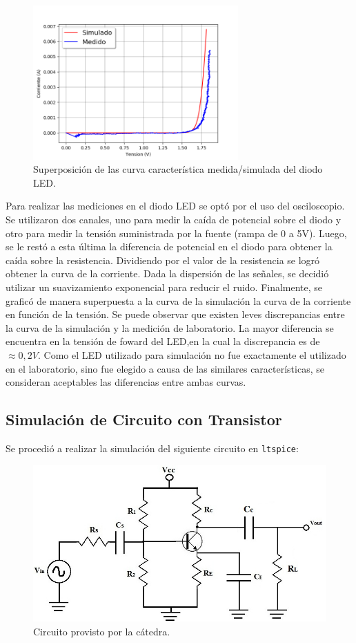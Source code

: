 \documentclass[a4paper]{article}
\begin{document}
\begin{figure}[H]
	\centering
	\includegraphics[width=0.7\textwidth]{CurvaDiodosLed.png}
	\caption{Superposición de las curva característica medida/simulada del diodo LED.}
	\label{fig:diodoled}
\end{figure}

Para realizar las mediciones en el diodo LED se optó por el uso del osciloscopio. Se utilizaron dos canales, uno para medir la caída de potencial sobre el diodo y otro para medir la tensión suministrada por la fuente (rampa de 0 a 5V). Luego, se le restó a esta última la diferencia de potencial en el diodo para obtener la caída sobre la resistencia. Dividiendo por el valor de la resistencia se logró obtener la curva de la corriente. Dada la dispersión de las señales, se decidió utilizar un suavizamiento exponencial para reducir el ruido. Finalmente, se graficó de manera superpuesta a la curva de la simulación la curva de la corriente en función de la tensión.
Se puede observar que existen leves discrepancias entre la curva de la simulación y la medición de laboratorio. La mayor diferencia se encuentra en la tensión de foward del LED,en  la cual la discrepancia es de $\approx 0,2V$.
Como el LED utilizado para simulación no fue exactamente el utilizado en el laboratorio, sino fue elegido a causa de las similares características, se consideran aceptables las diferencias entre ambas curvas.

\subsection*{Simulación de Circuito con Transistor}

Se procedió a realizar la simulación del siguiente circuito en \texttt{ltspice}:
\begin{figure}[H]
	\centering
	\includegraphics[width=0.6 \textwidth]{commonEmitter.jpg}	
	\caption{Circuito provisto por la cátedra.}
	\label{fig:cmnemitnpn}

\end{figure}
\end{document}
